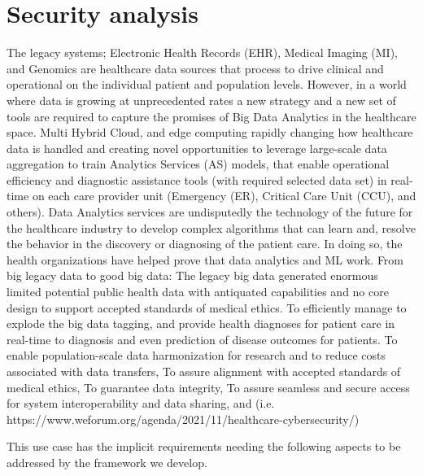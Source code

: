\section{Security analysis}


The legacy systems; Electronic Health Records (EHR), Medical Imaging (MI), and Genomics are healthcare data sources that process to drive clinical and operational on the individual patient and population levels. However, in a world where data is growing at unprecedented rates a new strategy and a new set of tools are required to capture the promises of Big Data Analytics in the healthcare space. Multi Hybrid Cloud, and edge computing rapidly changing how healthcare data is handled and creating novel opportunities to leverage large-scale data aggregation to train Analytics Services (AS) models, that enable operational efficiency and diagnostic assistance tools (with required selected data set) in real-time on each care provider unit (Emergency (ER), Critical Care Unit (CCU), and others).
Data Analytics services are undisputedly the technology of the future for the healthcare industry to develop complex algorithms that can learn and, resolve the behavior in the discovery or diagnosing of the patient care. In doing so, the health organizations have helped prove that data analytics and ML work.
From big legacy data to good big data:
The legacy big data generated enormous limited potential public health data with antiquated capabilities and no core design to support accepted standards of medical ethics.
To efficiently manage to explode the big data tagging, and provide health diagnoses for patient care in real-time to diagnosis and even prediction of disease outcomes for patients.
To enable population-scale data harmonization for research and to reduce costs associated with data transfers,
To assure alignment with accepted standards of medical ethics,
To guarantee data integrity,
To assure seamless and secure access for system interoperability and data sharing, and (i.e. https://www.weforum.org/agenda/2021/11/healthcare-cybersecurity/)




This use case has the implicit requirements needing the following
aspects to be addressed by the framework we develop.

